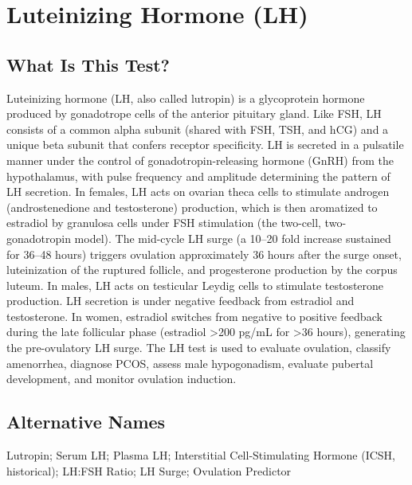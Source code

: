 \chapter{Luteinizing Hormone (LH)}

\section*{What Is This Test?}
Luteinizing hormone (LH, also called lutropin) is a glycoprotein hormone produced by gonadotrope cells of the anterior pituitary gland. Like FSH, LH consists of a common alpha subunit (shared with FSH, TSH, and hCG) and a unique beta subunit that confers receptor specificity. LH is secreted in a pulsatile manner under the control of gonadotropin-releasing hormone (GnRH) from the hypothalamus, with pulse frequency and amplitude determining the pattern of LH secretion. In females, LH acts on ovarian theca cells to stimulate androgen (androstenedione and testosterone) production, which is then aromatized to estradiol by granulosa cells under FSH stimulation (the two-cell, two-gonadotropin model). The mid-cycle LH surge (a 10--20 fold increase sustained for 36--48 hours) triggers ovulation approximately 36 hours after the surge onset, luteinization of the ruptured follicle, and progesterone production by the corpus luteum. In males, LH acts on testicular Leydig cells to stimulate testosterone production. LH secretion is under negative feedback from estradiol and testosterone. In women, estradiol switches from negative to positive feedback during the late follicular phase (estradiol >200 pg/mL for >36 hours), generating the pre-ovulatory LH surge. The LH test is used to evaluate ovulation, classify amenorrhea, diagnose PCOS, assess male hypogonadism, evaluate pubertal development, and monitor ovulation induction.

\section*{Alternative Names}
Lutropin; Serum LH; Plasma LH; Interstitial Cell-Stimulating Hormone (ICSH, historical); LH:FSH Ratio; LH Surge; Ovulation Predictor

